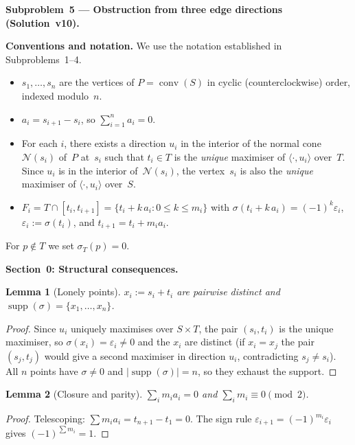 \documentclass{article}
\newtheorem{lemma}{Lemma}
\begin{document}
\textbf{Subproblem~5 --- Obstruction from three edge directions (Solution~v10).}

\medskip
\noindent\textbf{Conventions and notation.}
We use the notation established in Subproblems~1--4.
\begin{itemize}
  \item $s_1,\dots,s_n$ are the vertices of $P=\operatorname{conv}(S)$ in cyclic
        (counterclockwise) order, indexed modulo~$n$.
  \item $a_i = s_{i+1}-s_i$, so $\sum_{i=1}^n a_i = 0$.
  \item For each $i$, there exists a direction $u_i$ in the interior of the normal cone
        $\mathcal{N}(s_i)$ of~$P$ at~$s_i$ such that $t_i\in T$ is the \emph{unique}
        maximiser of $\langle\cdot,u_i\rangle$ over~$T$.
        Since $u_i$ is in the interior of~$\mathcal{N}(s_i)$, the vertex~$s_i$ is
        also the \emph{unique} maximiser of $\langle\cdot,u_i\rangle$ over~$S$.
  \item $F_i = T\cap[t_i,t_{i+1}]=\{t_i+k\,a_i:0\le k\le m_i\}$ with
        $\sigma(t_i+k\,a_i)=(-1)^k\varepsilon_i$, $\varepsilon_i:=\sigma(t_i)$,
        and $t_{i+1}=t_i+m_i a_i$.
\end{itemize}
For $p\notin T$ we set $\sigma_T(p)=0$.

\bigskip
\noindent\textbf{Section~0: Structural consequences.}

\begin{lemma}[Lonely points]\label{lem:lonely}
$x_i:=s_i+t_i$ are pairwise distinct and
$\operatorname{supp}(\sigma)=\{x_1,\dots,x_n\}$.
\end{lemma}
\begin{proof}
Since $u_i$ uniquely maximises over $S\times T$, the pair $(s_i,t_i)$ is the unique maximiser,
so $\sigma(x_i)=\varepsilon_i\ne 0$ and the $x_i$ are distinct (if $x_i=x_j$ the pair
$(s_j,t_j)$ would give a second maximiser in direction $u_i$, contradicting $s_j\ne s_i$).
All $n$ points have $\sigma\ne 0$ and $|\operatorname{supp}(\sigma)|=n$, so they
exhaust the support.
\end{proof}

\begin{lemma}[Closure and parity]\label{lem:closure}
$\sum_{i}m_i a_i=0$ and $\sum_i m_i\equiv 0\pmod{2}$.
\end{lemma}
\begin{proof}
Telescoping: $\sum m_i a_i=t_{n+1}-t_1=0$.
The sign rule $\varepsilon_{i+1}=(-1)^{m_i}\varepsilon_i$ gives $(-1)^{\sum m_i}=1$.
\end{proof}
\end{document}
